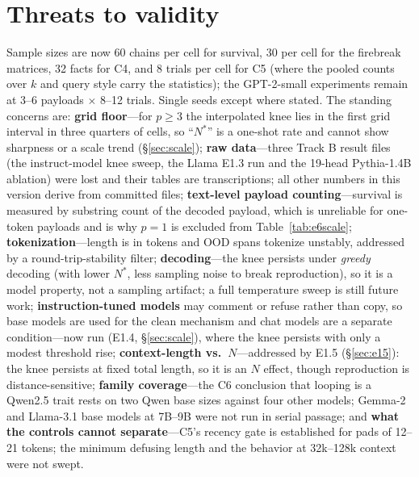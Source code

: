 \documentclass[11pt]{article}
\theoremstyle{plain}
\theoremstyle{definition}
\theoremstyle{remark}
\begin{document}
\section{Threats to validity}\label{sec:threats}
Sample sizes are now 60 chains per cell for survival, 30 per cell for the firebreak matrices,
32 facts for C4, and 8 trials per cell for C5 (where the pooled counts over $k$ and query style
carry the statistics); the GPT-2-small experiments remain at 3--6 payloads $\times$ 8--12
trials. Single seeds except where stated. The standing concerns are: \textbf{grid floor}---for
$p\ge3$ the interpolated knee lies in the first grid interval in three quarters of cells, so
``$N^*$'' is a one-shot rate and cannot show sharpness or a scale trend (\S\ref{sec:scale});
\textbf{raw data}---three Track B result files (the instruct-model knee sweep, the Llama E1.3
run and the 19-head Pythia-1.4B ablation) were lost and their tables are transcriptions; all
other numbers in this version derive from committed files; \textbf{text-level payload
counting}---survival is measured by substring count of the decoded payload, which is unreliable
for one-token payloads and is why $p{=}1$ is excluded from Table~\ref{tab:e6scale};
\textbf{tokenization}---length is in tokens and OOD spans tokenize unstably, addressed by a
round-trip-stability filter;
\textbf{decoding}---the knee persists under \emph{greedy} decoding (with lower $N^*$, less
sampling noise to break reproduction), so it is a model property, not a sampling artifact; a
full temperature sweep is still future work; \textbf{instruction-tuned models} may comment or
refuse rather than copy, so
base models are used for the clean mechanism and chat models are a separate condition---now
run (E1.4, \S\ref{sec:scale}), where the knee persists with only a modest threshold rise;
\textbf{context-length vs.\ $N$}---addressed by E1.5 (\S\ref{sec:e15}): the knee
persists at fixed total length, so it is an $N$ effect, though reproduction is
distance-sensitive; \textbf{family coverage}---the C6 conclusion that looping is a Qwen2.5
trait rests on two Qwen base sizes against four other models; Gemma-2 and Llama-3.1 base models
at 7B--9B were not run in serial passage; and \textbf{what the controls cannot separate}---C5's
recency gate is established for pads of 12--21 tokens; the minimum defusing length and the
behavior at 32k--128k context were not swept.

\end{document}
